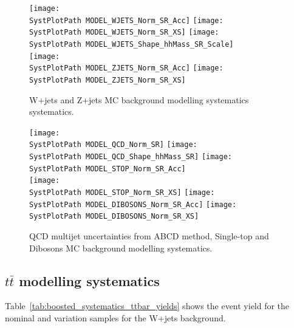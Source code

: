 \begin{figure}[!h]
\begin{center}
\texttt{[image: \\SystPlotPath  MODEL\_WJETS\_Norm\_SR\_Acc]}
\texttt{[image: \\SystPlotPath  MODEL\_WJETS\_Norm\_SR\_XS]} 
\texttt{[image: \\SystPlotPath  MODEL\_WJETS\_Shape\_hhMass\_SR\_Scale]} \\
\texttt{[image: \\SystPlotPath  MODEL\_ZJETS\_Norm\_SR\_Acc]} 
\texttt{[image: \\SystPlotPath  MODEL\_ZJETS\_Norm\_SR\_XS]}\\
\caption{W+jets and Z+jets MC background modelling systematics systematics.}
\label{fig:systplots_vjets}
\end{center}
\end{figure}

\begin{figure}[!h]
\begin{center}
\texttt{[image: \\SystPlotPath   MODEL\_QCD\_Norm\_SR]}
\texttt{[image: \\SystPlotPath   MODEL\_QCD\_Shape\_hhMass\_SR]}
\texttt{[image: \\SystPlotPath   MODEL\_STOP\_Norm\_SR\_Acc]}\\
\texttt{[image: \\SystPlotPath   MODEL\_STOP\_Norm\_SR\_XS]}
\texttt{[image: \\SystPlotPath   MODEL\_DIBOSONS\_Norm\_SR\_Acc]}
\texttt{[image: \\SystPlotPath   MODEL\_DIBOSONS\_Norm\_SR\_XS]}
\caption{QCD multijet uncertainties from ABCD method, Single-top and Dibosons MC background 
modelling systematics.}
\label{fig:systplots_qcd_stop_dibosons}
\end{center}
\end{figure}

\FloatBarrier



%
%
\subsection{$t\bar{t}$ modelling systematics}
\label{app:boosted_syst_ttbar}
Table~\ref{tab:boosted_systematics_ttbar_yields} shows the event yield for the nominal 
and variation samples for the W+jets background.

